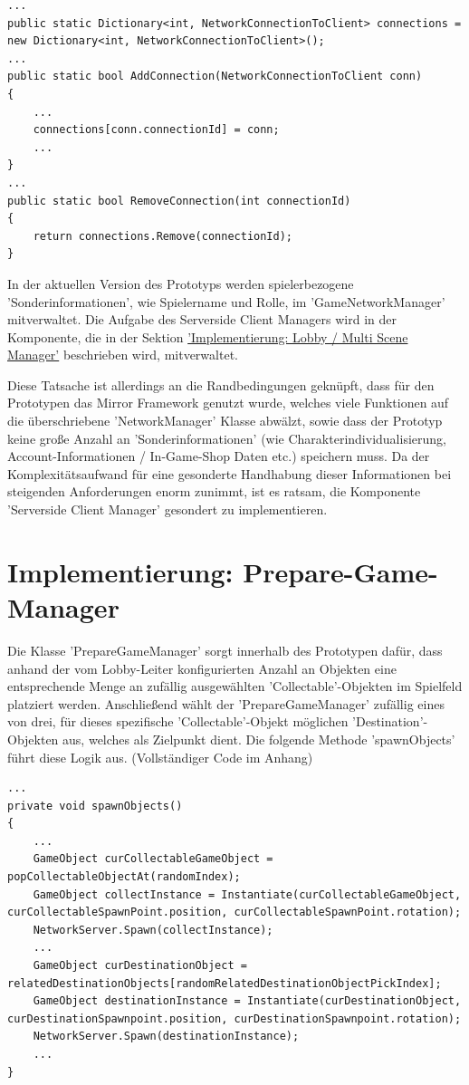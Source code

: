 \begin{lstlisting}[caption= Mirror Class NetworkServer.cs Connection Handling]
...
public static Dictionary<int, NetworkConnectionToClient> connections = new Dictionary<int, NetworkConnectionToClient>();
...
public static bool AddConnection(NetworkConnectionToClient conn)
{
	...
	connections[conn.connectionId] = conn;
	...
}
...
public static bool RemoveConnection(int connectionId)
{
	return connections.Remove(connectionId);
}
\end{lstlisting}

In der aktuellen Version des Prototyps werden spielerbezogene 'Sonderinformationen', wie Spielername und Rolle, im 'GameNetworkManager' mitverwaltet. Die Aufgabe des Serverside Client Managers wird in der Komponente, die in der Sektion \hyperref[Lobby Manager Implementierung]{'Implementierung: Lobby / Multi Scene Manager'} beschrieben wird, mitverwaltet. 

Diese Tatsache ist allerdings an die Randbedingungen geknüpft, dass für den Prototypen das Mirror Framework genutzt wurde, welches viele Funktionen auf die überschriebene 'NetworkManager' Klasse abwälzt, sowie dass der Prototyp keine große Anzahl an 'Sonderinformationen' (wie Charakterindividualisierung, Account-Informationen / In-Game-Shop Daten etc.) speichern muss. Da der Komplexitätsaufwand für eine gesonderte Handhabung dieser Informationen bei steigenden Anforderungen enorm zunimmt, ist es ratsam, die Komponente 'Serverside Client Manager' gesondert zu implementieren.

\section{Implementierung: Prepare-Game-Manager}
\label{Implementierung:prepare_game_manager}

Die Klasse 'PrepareGameManager' sorgt innerhalb des Prototypen dafür, dass anhand der vom Lobby-Leiter konfigurierten Anzahl an Objekten eine entsprechende Menge an zufällig ausgewählten 'Collectable'-Objekten im Spielfeld platziert werden. Anschließend wählt der 'PrepareGameManager' zufällig eines von drei, für dieses spezifische 'Collectable'-Objekt möglichen 'Destination'-Objekten aus, welches als Zielpunkt dient. Die folgende Methode 'spawnObjects' führt diese Logik aus. (Vollständiger Code im Anhang)

\begin{lstlisting}[caption= PrepareGameManager.cs Variablen und spawnObjects()]
...
private void spawnObjects()
{	
	...	
	GameObject curCollectableGameObject = popCollectableObjectAt(randomIndex);
	GameObject collectInstance = Instantiate(curCollectableGameObject, curCollectableSpawnPoint.position, curCollectableSpawnPoint.rotation);
	NetworkServer.Spawn(collectInstance);
	...
	GameObject curDestinationObject = relatedDestinationObjects[randomRelatedDestinationObjectPickIndex];
	GameObject destinationInstance = Instantiate(curDestinationObject, curDestinationSpawnpoint.position, curDestinationSpawnpoint.rotation);
	NetworkServer.Spawn(destinationInstance);
	...
}
\end{lstlisting}

